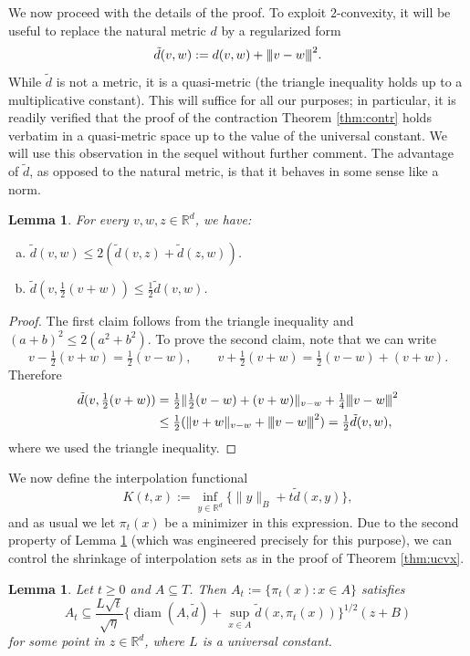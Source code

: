 \documentclass[10pt,reqno]{amsart}
\newtheorem{lem}[thm]{Lemma}
\theoremstyle{definition}
\numberwithin{equation}{section}
\numberwithin{figure}{section}
\numberwithin{table}{section}
\newcommand{\diam}{\mathop{\mathrm{diam}}}
\newcommand{\mynegspace}{\hspace{-0.12em}}
\newcommand{\vvv}{\rvert\mynegspace\rvert\mynegspace\rvert}
\newcommand{\nnn}[1]{{\vvv #1 \vvv}}
\begin{document}
We now proceed with the details of the proof. To exploit $2$-convexity, it 
will be useful to replace the natural metric $d$ by a regularized form
$$
	\tilde d(v,w) := d(v,w) + \nnn{v-w}^2.
$$
While $\tilde d$ is not a metric, it is a quasi-metric (the triangle 
inequality holds up to a multiplicative constant). This will suffice for 
all our purposes; in particular, it is readily verified that the proof of 
the contraction Theorem \ref{thm:contr} holds verbatim in a quasi-metric 
space up to the value of the universal constant. We will use this 
observation in the sequel without further comment.
The advantage of $\tilde d$, as opposed to the natural metric, is that it 
behaves in some sense like a norm.

\begin{lem}
\label{lem:quasi}
For every $v,w,z\in\mathbb{R}^d$, we have:
\begin{enumerate}[a.]
\item $\tilde d(v,w) \le 2(\tilde d(v,z)+\tilde d(z,w))$.
\item $\tilde d(v,\frac{1}{2}(v+w)) \le \frac{1}{2}\tilde d(v,w)$.
\end{enumerate}
\end{lem}

\begin{proof}
The first claim follows from the triangle inequality and
$(a+b)^2\le 2(a^2+b^2)$. To prove the second claim, note that
we can write
$$
	v - \tfrac{1}{2}(v+w) = \tfrac{1}{2}(v-w),\qquad
	v + \tfrac{1}{2}(v+w) = \tfrac{1}{2}(v-w) + (v+w).
$$
Therefore
\begin{align*}
	\tilde d(v,\tfrac{1}{2}(v+w)) &=
	\tfrac{1}{2}
	\|\tfrac{1}{2}(v-w) + (v+w)\|_{v-w}
	+
	\tfrac{1}{4}\nnn{v-w}^2 \\
	&\le
	\tfrac{1}{2}(\|v+w\|_{v-w} + \nnn{v-w}^2) =
	\tfrac{1}{2}\tilde d(v,w),
\end{align*}
where we used the triangle inequality.
\end{proof}

We now define the interpolation functional
$$
	K(t,x) := \inf_{y\in\mathbb{R}^d}\{
	\|y\|_B + t\tilde d(x,y)
	\},
$$
and as usual we let $\pi_t(x)$ be a minimizer in this 
expression. Due to the second property of Lemma \ref{lem:quasi} (which 
was engineered precisely for this purpose), we can control the shrinkage 
of interpolation sets as in the proof of Theorem \ref{thm:ucvx}.

\begin{lem}
\label{lem:gordonshrink}
Let $t\ge 0$ and $A\subseteq T$. Then $A_t :=\{\pi_t(x):x\in A\}$
satisfies
$$
	A_t \subseteq \frac{L\sqrt{t}}{\sqrt{\eta}}
	\bigg\{\diam(A,\tilde d)+\sup_{x\in A}\tilde d(x,\pi_t(x))
	\bigg\}^{1/2}
	(z+B)
$$
for some point in $z\in\mathbb{R}^d$,
where $L$ is a universal constant.
\end{lem}
\end{document}
